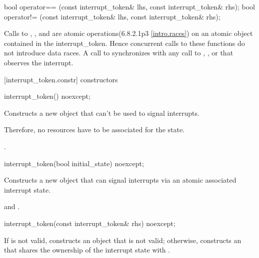 {\begin{codeblock}
bool operator== (const interrupt_token& lhs, const interrupt_token& rhs);
bool operator!= (const interrupt_token& lhs, const interrupt_token& rhs);
\end{codeblock}

Calls to , , and 
are atomic operations(6.8.2.1p3 \ref{intro.races}) on an atomic object contained in the interrupt_token.
Hence concurrent calls to these functions do not introduce data races. 
A call to  synchronizes with any call to ,
, or  that observes the interrupt.

[interrupt_token.constr]{ constructors}

%
\begin{itemdecl}
interrupt_token() noexcept;
\end{itemdecl}
\begin{itemdescr}
  \pnum\effects Constructs a new  object that can't be used to signal interrupts.
                \begin{note} Therefore, no resources have to be associated for the state.  \end{note}

  \pnum\postconditions {}.
\end{itemdescr}

%
\begin{itemdecl}
interrupt_token(bool initial_state) noexcept;
\end{itemdecl}
\begin{itemdescr}
  \pnum\effects Constructs a new  object that can signal interrupts
                via an atomic associated interrupt state.

  \pnum\postconditions {} and .
\end{itemdescr}

%
\begin{itemdecl}
interrupt_token(const interrupt_token& rhs) noexcept;
\end{itemdecl}
\begin{itemdescr}
  \pnum\effects If  is not valid, constructs an  object
                that is not valid;
                otherwise, constructs an 
                that shares the ownership of the interrupt state with .


\end{itemdescr}}
